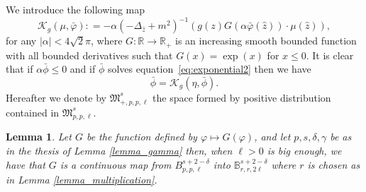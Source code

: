\documentclass[a4paper,10pt]{article}
\newtheorem{lemma}[theorem]{Lemma}
\begin{document}
We introduce the following map
\[ \mathcal{K}_g (\mu, \bar{\varphi}) : = - \alpha (- \Delta_{\hat{z}} +
   m^2)^{- 1} (g (z) G (\alpha \bar{\varphi} (\hat{z})) \cdot \mu (\hat{z})),
\]
for any $| \alpha | < 4 \sqrt{2} \pi$, where $G : \mathbb{R} \rightarrow
\mathbb{R}_+$ is an increasing smooth bounded function with all bounded
derivatives such that $G (x) = \exp (x)$ for $x \leqslant 0$. It is clear that
if $\alpha \bar{\phi} \leqslant 0$ and if $\bar{\phi}$ solves
equation~{\eqref{eq:exponential2}} then we have
\[ \bar{\phi} = \mathcal{K}_g (\eta, \bar{\phi}) . \]
Hereafter we denote by $\mathfrak{M}^s_{+, p, p, \ell}$ the space formed by
positive distribution contained in $\mathfrak{M}^s_{p, p, \ell}$.

\begin{lemma}
  \label{lemma_G}Let $G$ be the function defined by $\varphi \longmapsto G
  (\varphi)$, and let $p, s, \delta, \gamma$ be as in the thesis of Lemma
  \ref{lemma_gamma} then, when $\ell > 0$ is big enough, we have that $G$ is a
  continuous map from $B^{s + 2 - \delta}_{p, p, \ell}$ into $\mathbb{B}^{s +
  2 - \delta}_{r, r, 2 \ell}$ where $r$ is chosen as in Lemma
  \ref{lemma_multiplication}.
\end{lemma}
\end{document}
